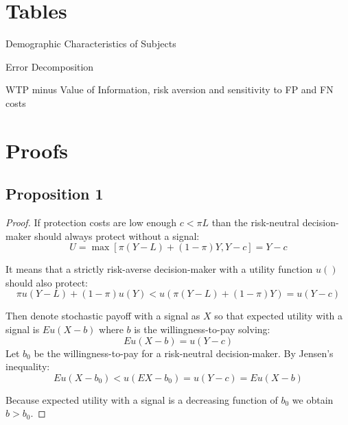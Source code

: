 \documentclass[12pt,a4paper]{article}
\begin{document}




\appendix

\newpage
\section{Tables}


\begin{table}[h!]
\caption{Demographic Characteristics of Subjects} \label{summ_tab}

\end{table}

\begin{table}[h!]
\caption{Error Decomposition} \label{belief_decomposition}

\end{table}

 \label{ip_tab}

 \label{wtp_dem}


\begin{table}[h!]
\caption{WTP minus Value of Information, risk aversion and sensitivity to FP and FN costs} \label{tab:wtp_risk}

\end{table}

%
%
%





\newpage
\section{Proofs}
\small

\subsection{Proposition 1}
\begin{proof} If protection costs are low enough $c<\pi L$ than the risk-neutral decision-maker should always protect without a signal:
$$U=\max[\pi(Y-L)+(1-\pi)Y,Y-c]=Y-c$$

It means that a strictly risk-averse decision-maker with a utility function $u()$ should also protect:
$$\pi u(Y-L)+(1-\pi)u(Y)<u(\pi(Y-L)+(1-\pi)Y)=u(Y-c)$$

Then denote stochastic payoff with a signal as $X$ so that expected utility with a signal is $Eu(X-b)$ where $b$ is the willingness-to-pay solving:
$$Eu(X-b)=u(Y-c)$$
 Let $b_0$ be the willingness-to-pay for a risk-neutral decision-maker. By Jensen's inequality:
$$Eu(X-b_0)<u(EX-b_0)=u(Y-c)=Eu(X-b)$$

Because expected utility with a signal is a decreasing function of $b_0$ we obtain $b>b_0$. \end{proof} 
\end{document}
